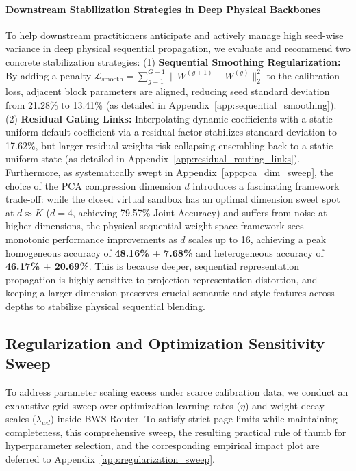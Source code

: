 \paragraph{Downstream Stabilization Strategies in Deep Physical Backbones}
To help downstream practitioners anticipate and actively manage high seed-wise variance in deep physical sequential propagation, we evaluate and recommend two concrete stabilization strategies:
(1) \textbf{Sequential Smoothing Regularization:} By adding a penalty $\mathcal{L}_{\text{smooth}} = \sum_{g=1}^{G-1} \|W^{(g+1)} - W^{(g)}\|_2^2$ to the calibration loss, adjacent block parameters are aligned, reducing seed standard deviation from 21.28\% to 13.41\% (as detailed in Appendix~\ref{app:sequential_smoothing}).
(2) \textbf{Residual Gating Links:} Interpolating dynamic coefficients with a static uniform default coefficient via a residual factor stabilizes standard deviation to 17.62\%, but larger residual weights risk collapsing ensembling back to a static uniform state (as detailed in Appendix~\ref{app:residual_routing_links}). Furthermore, as systematically swept in Appendix~\ref{app:pca_dim_sweep}, the choice of the PCA compression dimension $d$ introduces a fascinating framework trade-off: while the closed virtual sandbox has an optimal dimension sweet spot at $d \approx K$ ($d=4$, achieving 79.57\% Joint Accuracy) and suffers from noise at higher dimensions, the physical sequential weight-space framework sees monotonic performance improvements as $d$ scales up to 16, achieving a peak homogeneous accuracy of \textbf{48.16\% $\pm$ 7.68\%} and heterogeneous accuracy of \textbf{46.17\% $\pm$ 20.69\%}. This is because deeper, sequential representation propagation is highly sensitive to projection representation distortion, and keeping a larger dimension preserves crucial semantic and style features across depths to stabilize physical sequential blending.

\subsection{Regularization and Optimization Sensitivity Sweep}
To address parameter scaling excess under scarce calibration data, we conduct an exhaustive grid sweep over optimization learning rates ($\eta$) and weight decay scales ($\lambda_{wd}$) inside BWS-Router. To satisfy strict page limits while maintaining completeness, this comprehensive sweep, the resulting practical rule of thumb for hyperparameter selection, and the corresponding empirical impact plot are deferred to Appendix~\ref{app:regularization_sweep}.

